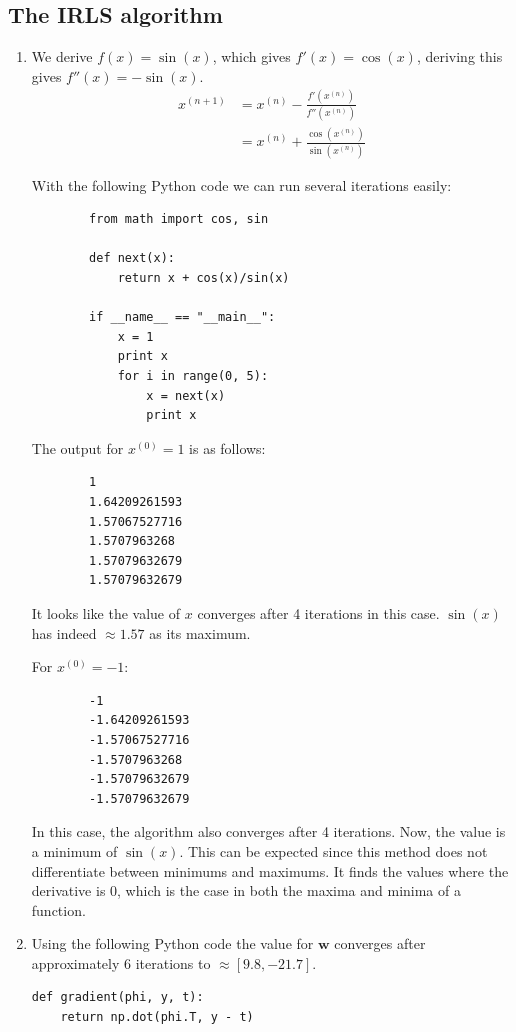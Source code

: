 \documentclass[paper=a4, fontsize=10pt]{scrartcl} %
\numberwithin{equation}{section} %
\numberwithin{figure}{section} %
\numberwithin{table}{section} %
\begin{document}
\subsection{The IRLS algorithm}
\begin{enumerate}
	\item 
		We derive $f(x) = \sin(x)$, which gives $f'(x) = \cos(x)$, deriving this gives $f''(x) = -\sin(x)$.
		\begin{align}
			x^{(n+1)} &= x^{(n)} - \frac{f'(x^{(n)})}{f''(x^{(n)})}\\
			&= x^{(n)} + \frac{\cos(x^{(n)})}{\sin(x^{(n)})}
		\end{align}

		With the following Python code we can run several iterations easily:

		\begin{verbatim}
		from math import cos, sin

		def next(x):
		    return x + cos(x)/sin(x)

		if __name__ == "__main__":
		    x = 1
		    print x
		    for i in range(0, 5):
		        x = next(x)
		        print x
		\end{verbatim}

		The output for $x^{(0)} = 1$ is as follows:

		\begin{verbatim}
		1
		1.64209261593
		1.57067527716
		1.5707963268
		1.57079632679
		1.57079632679
		\end{verbatim}

		It looks like the value of $x$ converges after 4 iterations in this case. $\sin(x)$ has indeed $\approx 1.57$ as its maximum.

		For $x^{(0)} = -1$:

		\begin{verbatim}
		-1
		-1.64209261593
		-1.57067527716
		-1.5707963268
		-1.57079632679
		-1.57079632679
		\end{verbatim}

		In this case, the algorithm also converges after 4 iterations. Now, the value is a minimum of $\sin(x)$. This can be expected since this method does not differentiate between minimums and maximums. It finds the values where the derivative is 0, which is the case in both the maxima and minima of a function.
	\item
		Using the following Python code the value for $\boldsymbol w$ converges after approximately 6 iterations to $\approx [9.8, -21.7]$.
		\begin{verbatim}
def gradient(phi, y, t):
    return np.dot(phi.T, y - t)


\end{verbatim}
\end{enumerate}
\end{document}
